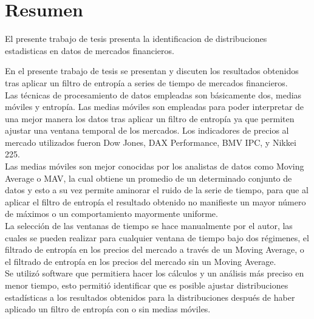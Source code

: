 %

\chapter*{Resumen}
\label{sec:abstract}


El presente trabajo de tesis presenta la identificacion de distribuciones estadisticas en datos de mercados financieros. 

En el presente trabajo de tesis se presentan y discuten los resultados obtenidos tras aplicar un filtro de entropía a series de tiempo de mercados financieros.\\

 
Las técnicas de procesamiento de datos empleadas son básicamente dos, medias móviles y entropía. Las medias móviles son empleadas para poder interpretar de una mejor manera los datos tras aplicar un filtro de entropía ya que permiten ajustar una ventana temporal de los mercados. Los indicadores de precios al mercado utilizados fueron Dow Jones, DAX Performance, BMV IPC, y Nikkei 225.\\

Las medias móviles son mejor conocidas por los analistas de datos como Moving Average o MAV, la cual obtiene un promedio de un determinado conjunto de datos y esto a su vez permite aminorar el ruido de la serie de tiempo, para que al aplicar el filtro de entropía el resultado obtenido no manifieste un mayor número de máximos o un comportamiento mayormente uniforme.\\

La selección de las ventanas de tiempo se hace manualmente por el autor, las cuales se pueden realizar para cualquier ventana de tiempo bajo dos régimenes, el filtrado de entropía en los precios del mercado a través de un Moving Average, o el filtrado de entropía en los precios del mercado sin un Moving Average.\\

Se utilizó software que permitiera hacer los cálculos y un análisis más preciso en menor tiempo, esto permitió identificar que es posible ajustar distribuciones estadísticas a los resultados obtenidos para la distribuciones después de haber aplicado un filtro de entropía con o sin medias móviles. %
\cleardoublepage